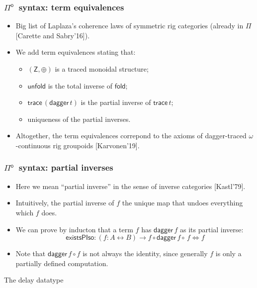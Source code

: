 \documentclass[12pt,t]{beamer}
\newcommand{\Pio}{\ensuremath{\mathsf{\Pi}^{\mathsf{o}}}}
\newcommand{\lr}{\longleftrightarrow}
\newcommand{\fold}{\mathsf{fold}}
\newcommand{\unfold}{\mathsf{unfold}}
\newcommand{\trace}{\ensuremath{\mathsf{trace}}}
\newcommand{\Z}{\mathsf{Z}}
\newcommand{\LR}{\iff}
\renewcommand{\dagger}{\mathsf{dagger}}
\begin{document}
\begin{frame}
  \frametitle{\Pio\ syntax: term equivalences}
  \begin{itemize}    
  \item Big list of Laplaza's coherence laws of symmetric rig
    categories (already in $\Pi$ [Carette and Sabry'16]).
  \item We add term equivalences stating that:
    \begin{itemize}
    \item $(\Z,\oplus)$ is a traced monoidal structure;
    \item $\unfold$ is the total inverse of $\fold$;
    \item $\trace\,(\dagger \,t)$ is the partial inverse of $\trace\,t$;
    \item uniqueness of the partial inverses.
    \end{itemize}

    \vspace{\fill}
  \item Altogether, the term equivalences correpond to the axioms of
    dagger-traced $\omega$-continuous rig groupoids [Karvonen'19].
    \end{itemize}
\end{frame}

\begin{frame}
  \frametitle{\Pio\ syntax: partial inverses}
  \begin{itemize}
  \item Here we mean ``partial inverse'' in the sense of inverse
    categories [Kastl'79].
  \item Intuitively, the partial inverse of $f$ the unique map that
    undoes everything which $f$ does.
  \item We can prove by inducton that a term $f$ has $\dagger\,f$ as
    its partial inverse:
    \[
    \mathsf{existsPIso} : (f : A \lr B) \to f \circ \dagger\,f
    \circ\,f \LR f
    \]
    \vspace{\fill}
  \item Note that $\dagger \,f \circ f$ is not always the identity,
    since generally $f$ is only a partially defined computation.
  \end{itemize}
\end{frame}

\begin{frame}[c]
  \begin{center}
    \Huge The delay datatype
  \end{center}
\end{frame}
\end{document}
